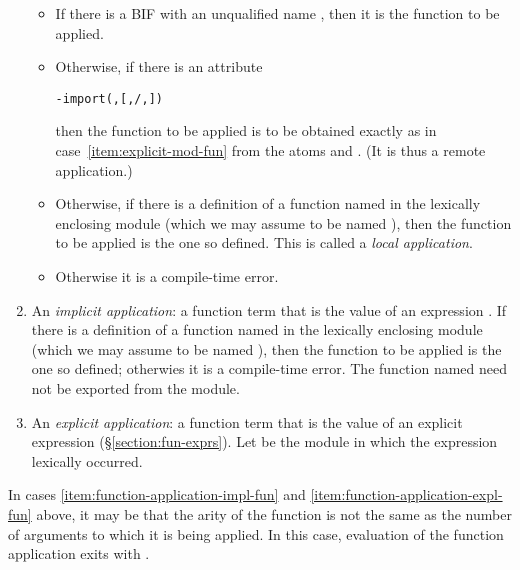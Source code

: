 \begin{enumerate}
\begin{itemize}
\item If there is a BIF with an unqualified name
, then it is the function to be applied.

\item Otherwise, if there is an attribute
\begin{alltt}
-import(,[\tdots,/,\tdots])
\end{alltt}
then the function to be applied is to be obtained exactly as in
case~\ref{item:explicit-mod-fun} from the atoms  and .
(It is thus a remote application.)

\item Otherwise, if there is a definition of a function named
 in the lexically enclosing module (which we may
assume to be named ), then the function to be applied is the
one so defined.  This is called a \emph{local
application}.

\item Otherwise it is a compile-time error.
\end{itemize}

\item \label{item:function-application-impl-fun}
An \emph{implicit  application}: a function term that is the
value of an expression .  If there is a
definition of a function named  in the lexically
enclosing module (which we may assume to be named ), then the
function to be applied is the one so defined; otherwies it is a
compile-time error.  The function named  need not be
exported from the module.

\item \label{item:function-application-expl-fun}
An \emph{explicit  application}:
a function term that is the value of an explicit  expression
(\S\ref{section:fun-exprs}).
Let  be the module in which the  expression lexically occurred.
\end{enumerate}
In cases \ref{item:function-application-impl-fun} and
\ref{item:function-application-expl-fun} above, it may be that
the arity of the function is not the same as the number of arguments
to which it is being applied.  In this case, evaluation of the
function application exits with
.

